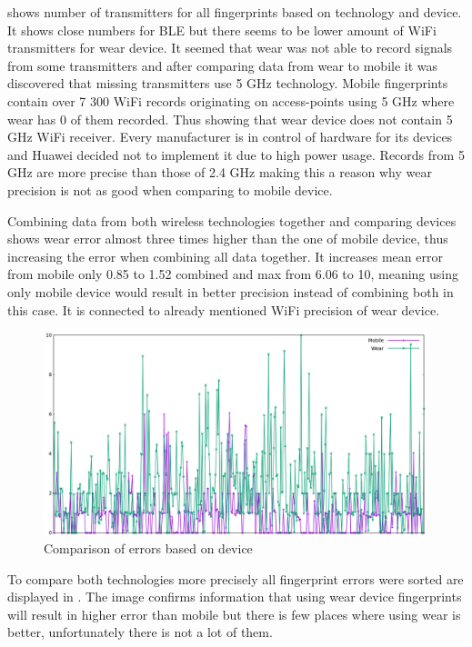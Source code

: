  shows number of transmitters for all fingerprints based on technology and device. It shows close numbers for BLE but there seems to be lower amount of WiFi transmitters for wear device. It seemed that wear was not able to record signals from some transmitters and after comparing data from wear to mobile it was discovered that missing transmitters use 5 GHz technology. Mobile fingerprints contain over 7 300 WiFi records originating on access-points using 5 GHz where wear has 0 of them recorded. Thus showing that wear device does not contain 5 GHz WiFi receiver. Every manufacturer is in control of hardware for its devices and Huawei decided not to implement it due to high power usage. Records from 5 GHz are more precise than those of 2.4 GHz making this a reason why wear precision is not as good when comparing to mobile device.

Combining data from both wireless technologies together and comparing devices shows wear error almost three times higher than the one of mobile device, thus increasing the error when combining all data together. It increases mean error from mobile only 0.85 to 1.52 combined and max from 6.06 to 10, meaning using only mobile device would result in better precision instead of combining both in this case. It is connected to already mentioned WiFi precision of wear device.

\begin{figure}[h!]
	\begin{centering}
		\includegraphics[width=1\textwidth]{img/wknn_errors_mobile_phone}
		\par\end{centering}
	\caption{Comparison of errors based on device}
	\label{fig06c06}
\end{figure}

To compare both technologies more precisely all fingerprint errors were sorted are displayed in . The image confirms information that using wear device fingerprints will result in higher error than mobile but there is few places where using wear is better, unfortunately there is not a lot of them. 

